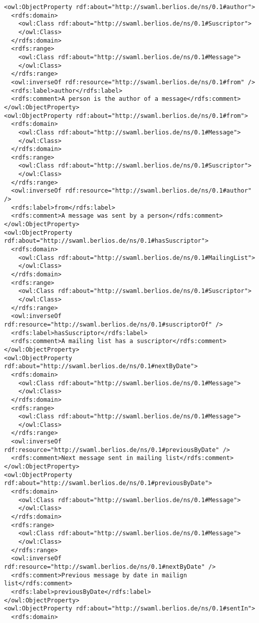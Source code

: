 \begin{verbatim}
<owl:ObjectProperty rdf:about="http://swaml.berlios.de/ns/0.1#author">
  <rdfs:domain>
    <owl:Class rdf:about="http://swaml.berlios.de/ns/0.1#Suscriptor">
    </owl:Class>
  </rdfs:domain>
  <rdfs:range>
    <owl:Class rdf:about="http://swaml.berlios.de/ns/0.1#Message">
    </owl:Class>
  </rdfs:range>
  <owl:inverseOf rdf:resource="http://swaml.berlios.de/ns/0.1#from" />
  <rdfs:label>author</rdfs:label>
  <rdfs:comment>A person is the author of a message</rdfs:comment>
</owl:ObjectProperty>
<owl:ObjectProperty rdf:about="http://swaml.berlios.de/ns/0.1#from">
  <rdfs:domain>
    <owl:Class rdf:about="http://swaml.berlios.de/ns/0.1#Message">
    </owl:Class>
  </rdfs:domain>
  <rdfs:range>
    <owl:Class rdf:about="http://swaml.berlios.de/ns/0.1#Suscriptor">
    </owl:Class>
  </rdfs:range>
  <owl:inverseOf rdf:resource="http://swaml.berlios.de/ns/0.1#author" />
  <rdfs:label>from</rdfs:label>
  <rdfs:comment>A message was sent by a person</rdfs:comment>
</owl:ObjectProperty>
<owl:ObjectProperty rdf:about="http://swaml.berlios.de/ns/0.1#hasSuscriptor">
  <rdfs:domain>
    <owl:Class rdf:about="http://swaml.berlios.de/ns/0.1#MailingList">
    </owl:Class>
  </rdfs:domain>
  <rdfs:range>
    <owl:Class rdf:about="http://swaml.berlios.de/ns/0.1#Suscriptor">
    </owl:Class>
  </rdfs:range>
  <owl:inverseOf rdf:resource="http://swaml.berlios.de/ns/0.1#suscriptorOf" />
  <rdfs:label>hasSuscriptor</rdfs:label>
  <rdfs:comment>A mailing list has a suscriptor</rdfs:comment>
</owl:ObjectProperty>
<owl:ObjectProperty rdf:about="http://swaml.berlios.de/ns/0.1#nextByDate">
  <rdfs:domain>
    <owl:Class rdf:about="http://swaml.berlios.de/ns/0.1#Message">
    </owl:Class>
  </rdfs:domain>
  <rdfs:range>
    <owl:Class rdf:about="http://swaml.berlios.de/ns/0.1#Message">
    </owl:Class>
  </rdfs:range>
  <owl:inverseOf rdf:resource="http://swaml.berlios.de/ns/0.1#previousByDate" />
  <rdfs:comment>Next message sent in mailing list</rdfs:comment>
</owl:ObjectProperty>
<owl:ObjectProperty rdf:about="http://swaml.berlios.de/ns/0.1#previousByDate">
  <rdfs:domain>
    <owl:Class rdf:about="http://swaml.berlios.de/ns/0.1#Message">
    </owl:Class>
  </rdfs:domain>
  <rdfs:range>
    <owl:Class rdf:about="http://swaml.berlios.de/ns/0.1#Message">
    </owl:Class>
  </rdfs:range>
  <owl:inverseOf rdf:resource="http://swaml.berlios.de/ns/0.1#nextByDate" />
  <rdfs:comment>Previous message by date in mailign list</rdfs:comment>
  <rdfs:label>previousByDate</rdfs:label>
</owl:ObjectProperty>
<owl:ObjectProperty rdf:about="http://swaml.berlios.de/ns/0.1#sentIn">
  <rdfs:domain>

\end{verbatim}

